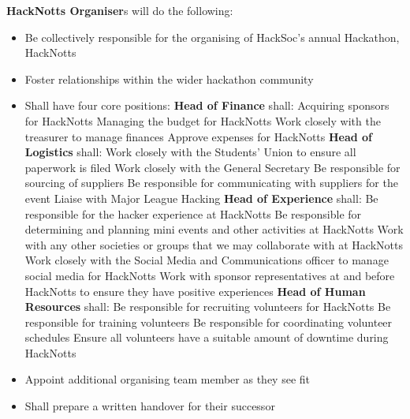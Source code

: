 \item \textbf{HackNotts Organiser}s will do the following:
\begin{itemize}
  \item Be collectively responsible for the organising of HackSoc's annual Hackathon, HackNotts
  \item Foster relationships within the wider hackathon community
  \item Shall have four core positions:
    \subitem \textbf{Head of Finance} shall:
      \subsubitem Acquiring sponsors for HackNotts
      \subsubitem Managing the budget for HackNotts
      \subsubitem Work closely with the treasurer to manage finances
      \subsubitem Approve expenses for HackNotts
    \subitem \textbf{Head of Logistics} shall:
      \subsubitem Work closely with the Students' Union to ensure all paperwork is filed
      \subsubitem Work closely with the General Secretary
      \subsubitem Be responsible for sourcing of suppliers
      \subsubitem Be responsible for communicating with suppliers for the event
      \subsubitem Liaise with Major League Hacking
    \subitem \textbf{Head of Experience} shall:
      \subsubitem Be responsible for the hacker experience at HackNotts
      \subsubitem Be responsible for determining and planning mini events and other activities at HackNotts
      \subsubitem Work with any other societies or groups that we may collaborate with at HackNotts
      \subsubitem Work closely with the Social Media and Communications officer to manage social media for HackNotts
      \subsubitem Work with sponsor representatives at and before HackNotts to ensure they have positive experiences
    \subitem \textbf{Head of Human Resources} shall:
      \subsubitem Be responsible for recruiting volunteers for HackNotts
      \subsubitem Be responsible for training volunteers
      \subsubitem Be responsible for coordinating volunteer schedules
      \subsubitem Ensure all volunteers have a suitable amount of downtime during HackNotts
  \item Appoint additional organising team member as they see fit
  \item Shall prepare a written handover for their successor
\end{itemize}
